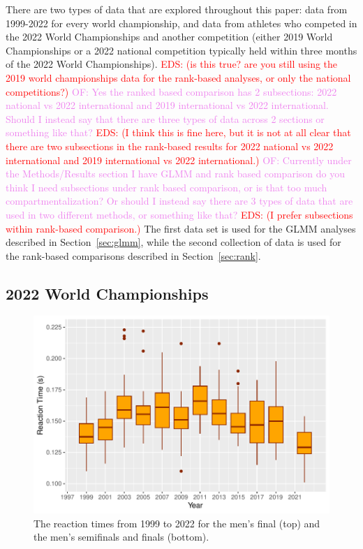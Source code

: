 \documentclass[12pt, letterpaper, titlepage]{article}
\newcommand{\eds}[1]{\textcolor{red}{EDS: (#1)}}
\newcommand{\of}[1]{\textcolor{violet}{OF: #1}}
\begin{document}
There are two types of data that are explored throughout this paper: data from
1999-2022 for every world championship, and data from athletes who competed in
the 2022 World Championships and another competition (either 2019 World 
Championships or a 2022 national competition typically held within three months 
of the 2022 World Championships). 
\eds{is this true? are you still using the 2019 world championships data for the
rank-based analyses, or only the national competitions?}
\of{Yes the ranked based comparison has 2 subsections: 2022 national vs 2022
international and 2019 international vs 2022 international.  Should I instead say
that there are three types of data across 2 sections or something like that?}
\eds{I think this is fine here, but it is not at all clear that there are two
subsections in the rank-based results for 2022 national vs 2022
international and 2019 international vs 2022 international.}
\of{Currently under the Methods/Results section I have GLMM and rank based comparison
do you think I need subsections under rank based comparison, or is that too much
compartmentalization?  Or should I instead say there are 3 types of data that are
used in two different methods, or something like that?} \eds{I prefer
subsections within rank-based comparison.}
The first data set is used for the GLMM analyses described in 
Section~\ref{sec:glmm}, while the second collection of data is used for the 
rank-based comparisons described in Section~\ref{sec:rank}.


\subsection{2022 World Championships}\label{sec:dataworld}

\begin{figure}[tbp]
  \centering
  \includegraphics{Pooled_Boxplot}
  \caption{The reaction times from 1999 to 2022 for the men's final (top) and
  the men's semifinals and finals (bottom).}
  \label{fig:Boxplots}
\end{figure}
\end{document}
